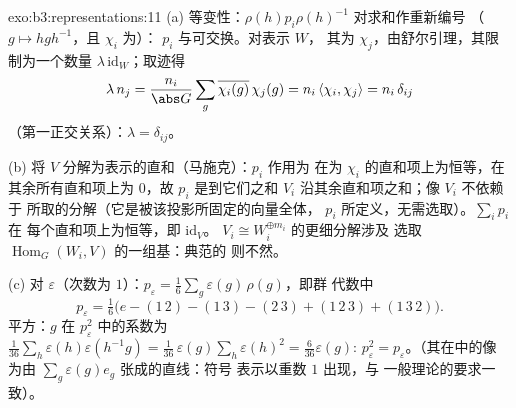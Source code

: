 \begin{solution}{exo:b3:representations:11}
(a) 等变性：$\rho(h)p_i\rho(h)^{-1}$ 对求和作重新编号
（$g \mapsto hgh^{-1}$，且 $\chi_i$ 为）：
$p_i$ 与可交换。对表示 $W$，
其为 $\chi_j$，由舒尔引理，其限制为一个数量
$\lambda\,\mathrm{id}_W$；取迹得
\[
\lambda\,n_j = \frac{n_i}{\abs G}\sum_g
\overline{\chi_i(g)}\,\chi_j(g) = n_i\,\langle\chi_i,
\chi_j\rangle = n_i\,\delta_{ij}
\]
（第一正交关系）：$\lambda = \delta_{ij}$。

(b) 将 $V$ 分解为表示的直和（马施克）：$p_i$ 作用为
在为 $\chi_i$ 的直和项上为恒等，在
其余所有直和项上为 $0$，故 $p_i$ 是到它们之和 $V_i$
沿其余直和项之和；像 $V_i$ 不依赖于
所取的分解（它是被该投影所固定的向量全体，
$p_i$ 所定义，无需选取）。$\sum_ip_i$ 在
每个直和项上为恒等，即 $\mathrm{id}_V$。
$V_i \cong W_i^{\oplus m_i}$ 的更细分解涉及
选取 $\operatorname{Hom}_G(W_i, V)$ 的一组基：典范的
则不然。

(c) 对 $\varepsilon$（次数为 $1$）：$p_\varepsilon =
\frac1{6}\sum_{g}\varepsilon(g)\,\rho(g)$，即群
代数中
\[
p_\varepsilon = \tfrac16\bigl(e - (1\,2) - (1\,3) - (2\,3)
+ (1\,2\,3) + (1\,3\,2)\bigr) .
\]
平方：$g$ 在 $p_\varepsilon^2$ 中的系数为
$\frac1{36}\sum_{h}\varepsilon(h)\varepsilon(h^{-1}g) =
\frac1{36}\,\varepsilon(g)\sum_h\varepsilon(h)^2 =
\frac{6}{36}\varepsilon(g)$: $p_\varepsilon^2 =
p_\varepsilon$。（其在中的像
为由 $\sum_g\varepsilon(g)e_g$ 张成的直线：符号
表示以重数 $1$ 出现，与
一般理论的要求一致）。
\end{solution}

